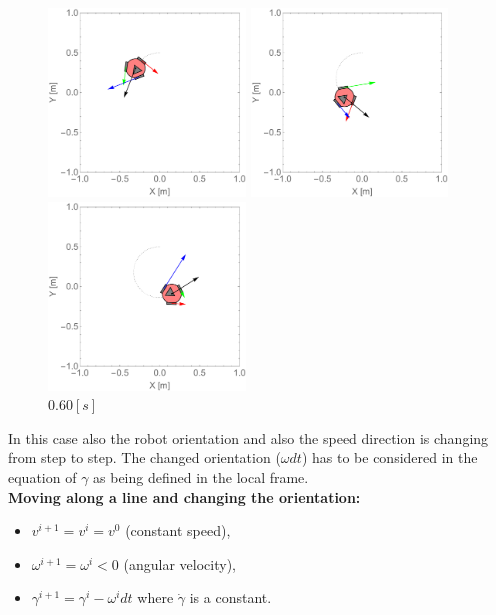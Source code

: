 \documentclass[12pt,english,twoside]{article}
\begin{document}
\begin{figure}[htb!]
	\centering
	\includegraphics[height=5cm]{figures/2d_simulation/animations/2D_move_along_circle_rotating_reverse_direction/20}
	\caption{$0.20[s]$}
	\endminipage\hfill
	\centering
	\includegraphics[height=5cm]{figures/2d_simulation/animations/2D_move_along_circle_rotating_reverse_direction/40}
	\caption{$0.40[s]$}
	\endminipage\hfill
	\centering
	\includegraphics[height=5cm]{figures/2d_simulation/animations/2D_move_along_circle_rotating_reverse_direction/60}
	\caption{$0.60[s]$}
	\endminipage\hfill
\end{figure}
In this case also the robot orientation and also the speed direction is changing from step to step. The changed orientation ($\omega dt$) has to be considered in the equation of $\gamma$ as being defined in the local frame.\\[0.3cm] 
\noindent \textbf{Moving along a line and changing the orientation:}
\begin{itemize}
	\item $v^{i+1} = v^{i} = v^{0}$ (constant speed),
	\item $\omega^{i+1} = \omega^{i}<0$ (angular velocity),
	\item $\gamma^{i+1} = \gamma^i -\omega^i dt$ where $\dot \gamma$ is a constant.
\end{itemize}
\end{document}
